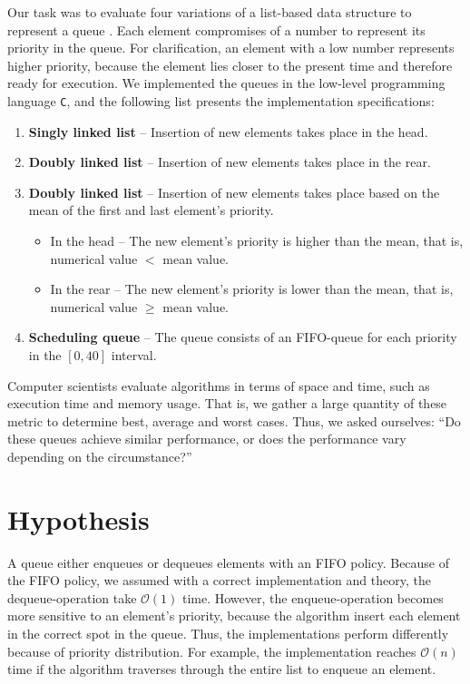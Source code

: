 \documentclass[a4paper,11pt]{kth-mag}
\newcommand*{\skippara}{\par\vspace{\baselineskip} \noindent}
\begin{document}
\skippara Our task was to evaluate four variations of a list-based data structure to represent a queue \cite{Uppgiftl9:online}.
Each element compromises of a number to represent its priority in the queue.
For clarification, an element with a low number represents higher priority, because the element lies closer to the present time and therefore ready for execution.
We implemented the queues in the low-level programming language \texttt{C}, and the following list presents the implementation specifications:
\begin{enumerate}
    \item \textbf{Singly linked list} -- Insertion of new elements takes place in the head.
    \item \textbf{Doubly linked list} -- Insertion of new elements takes place in the rear.
        \item \textbf{Doubly linked list} -- Insertion of new elements takes place based on the mean of the first and last element's priority.
        \begin{itemize}
            \item In the head -- The new element's priority is higher than the mean, that is, \\numerical value $<$ mean value.
            \item In the rear -- The new element's priority is lower than the mean, that is,\\numerical value $\ge$ mean value.
        \end{itemize}
    \item \textbf{Scheduling queue} -- The queue consists of an FIFO-queue for each priority in the $[0,40]$ interval.
\end{enumerate}

\skippara
Computer scientists evaluate algorithms in terms of space and time, such as execution time and memory usage.
That is, we gather a large quantity of these metric to determine best, average and worst cases.
Thus, we asked ourselves: ``Do these queues achieve similar performance, or does the performance vary depending on the circumstance?''


\clearpage
\section{Hypothesis}
A queue either enqueues or dequeues elements with an FIFO policy.
Because of the FIFO policy, we assumed with a correct implementation and theory, the dequeue-operation take $\mathcal{O}(1)$ time.
However, the enqueue-operation becomes more sensitive to an element's priority, because the algorithm insert each element in the correct spot in the queue.
Thus, the implementations perform differently because of priority distribution.
For example, the implementation reaches $\mathcal{O}(n)$ time if the algorithm traverses through the entire list to enqueue an element.
\end{document}
